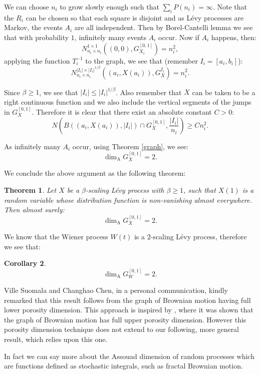 \documentclass{amsart}
\newcommand{\Assouad}{\dim_{\mathrm{A}}}
\newtheorem{thm}{Theorem}[section]
\newtheorem{cor}[thm]{Corollary}
\begin{document}
We can choose $n_i$ to grow slowly enough such that $\sum_{i}P(n_i)=\infty$. Note that the $R_i$ can be chosen so that each square is disjoint and as L\'evy processes are Markov, the events $A_i$ are all independent. Then by Borel-Cantelli lemma we see that with probability $1$, infinitely many events $A_i$ occur. Now if $A_i$ happens, then:
\[
N_{n_i\times n_i}^{1 \times 1 }\left((0,0),G_{X_i}^{[0,1]}\right)=n_i^2,
\]
applying the function $T^{-1}_i$ to the graph, we see that (remember $I_i=[a_i,b_i]$):
\[
N_{n_i\times n_i}^{|I_i| \times |I_i|^{1/\beta} }\left((a_i,X(a_i)),G_{X}^{I_i}\right)=n_i^2.
\]

Since $\beta\geq 1$, we see that $|I_i|\leq |I_i|^{1/\beta}$. Also remember that $X$ can be taken to be a right continuous function and we also include the vertical segments of the jumps in $G^{[0,1]}_X$. Therefore it is clear that there exist an absolute constant $C>0$:
\[
N\left(B\left(\left(a_i,X(a_i)\right),|I_i|\right)\cap G_X^{[0,1]},\frac{|I_i|}{n_i}\right)\geq C n_i^2.
\] 

As infinitely many $A_i$ occur, using Theorem \ref{graph}, we see:
 \[
 \Assouad G_{X}^{[0,1]}=2.
 \]
 
 We conclude the above argument as the following theorem:
 \begin{thm}\label{Main}
 	Let $X$ be a $\beta$-scaling L\'evy process with $\beta\geq 1$, such that $X(1)$ is a random variable whose distribution function is non-vanishing almost everywhere. Then almost surely:
 	\[
 	\Assouad G_{X}^{[0,1]}=2.
 	\]
 \end{thm}

We know that the Wiener process $W(t)$ is a $2$-scaling L\'evy process, therefore we see that:
\begin{cor}
		\[
	\Assouad G_{W}^{[0,1]}=2.
	\]
\end{cor}

Ville Suomala and Changhao Chen, in a personal communication, kindly remarked that this result follows from the graph of Brownian motion having full lower porosity dimension. This approach is inspired by \cite{coxgriffin}, where it was shown that the graph of Brownian motion has full upper porosity dimension. However this porosity dimension technique does not extend to our following, more general result, which relies upon this one.

In fact we can say more about the Assouad dimension of random processes which are functions defined as stochastic integrals, such as fractal Brownian motion. 
\end{document}
